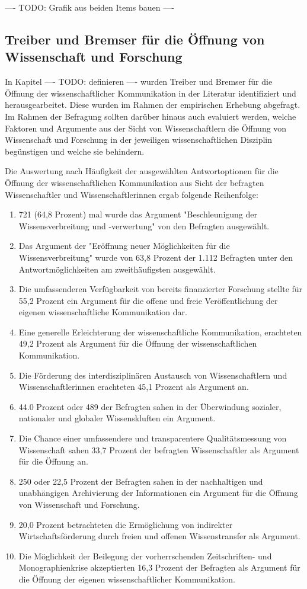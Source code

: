 ---- TODO: Grafik aus beiden Items bauen ----

\subsection{Treiber und Bremser für die Öffnung von Wissenschaft und Forschung}

In Kapitel ---- TODO: definieren ---- wurden Treiber und Bremser für die Öffnung der wissenschaftlicher Kommunikation in der Literatur identifiziert und herausgearbeitet. Diese wurden im Rahmen der empirischen Erhebung abgefragt. Im Rahmen der Befragung sollten darüber hinaus auch evaluiert werden, welche Faktoren und Argumente aus der Sicht von Wissenschaftlern die Öffnung von Wissenschaft und Forschung in der jeweiligen wissenschaftlichen Disziplin begünstigen und welche sie behindern.

Die Auswertung nach Häufigkeit der ausgewählten Antwortoptionen für die Öffnung der wissenschaftlichen Kommunikation aus Sicht der befragten Wissenschaftler und Wissenschaftlerinnen ergab folgende Reihenfolge:
\begin{enumerate}
\item 721 (64,8 Prozent) mal wurde das Argument "Beschleunigung der Wissensverbreitung und -verwertung" von den Befragten ausgewählt.
\item Das Argument der "Eröffnung neuer Möglichkeiten für die Wissensverbreitung" wurde von 63,8 Prozent der 1.112 Befragten unter den Antwortmöglichkeiten am zweithäufigsten ausgewählt.
\item Die umfassenderen Verfügbarkeit von bereits finanzierter Forschung stellte für 55,2 Prozent ein Argument für die offene und freie Veröffentlichung der eigenen wissenschaftliche Kommunikation dar.
\item Eine generelle Erleichterung der wissenschaftliche Kommunikation, erachteten 49,2 Prozent als Argument für die Öffnung der wissenschaftlichen Kommunikation.
\item Die Förderung des interdisziplinären Austausch von Wissenschaftlern und Wissenschaftlerinnen erachteten 45,1 Prozent als Argument an.
\item 44.0 Prozent oder 489 der Befragten sahen in der Überwindung sozialer, nationaler und globaler Wissenskluften ein Argument.
\item Die Chance einer umfassendere und transparentere Qualitätsmessung von Wissenschaft sahen 33,7 Prozent der befragten Wissenschaftler als Argument für die Öffnung an.
\item 250 oder 22,5 Prozent der Befragten sahen in der nachhaltigen und unabhängigen Archivierung der Informationen ein Argument für die Öffnung von Wissenschaft und Forschung.
\item 20,0 Prozent betrachteten die Ermöglichung von indirekter Wirtschaftsförderung durch freien und offenen Wissenstransfer als Argument.
\item Die Möglichkeit der Beilegung der vorherrschenden Zeitschriften- und Monographienkrise akzeptierten 16,3 Prozent der Befragten als Argument für die Öffnung der eigenen wissenschaftlicher Kommunikation.
\end{enumerate}

